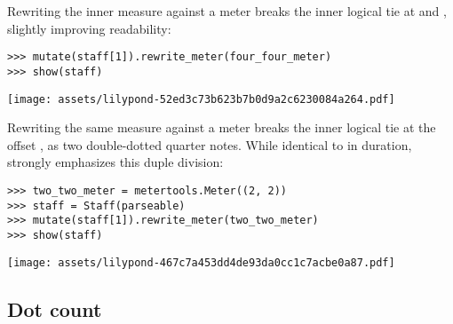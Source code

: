 \noindent Rewriting the inner measure against a  meter breaks the
inner logical tie at  and , slightly improving
readability:

\begin{comment}
<abjad>
mutate(staff[1]).rewrite_meter(four_four_meter)
show(staff)
</abjad>
\end{comment}

\begin{abjadbookoutput}
\begin{singlespacing}
\vspace{-0.5\baselineskip}
\begin{verbatim}
>>> mutate(staff[1]).rewrite_meter(four_four_meter)
>>> show(staff)
\end{verbatim}
\noindent\texttt{[image: assets/lilypond-52ed3c73b623b7b0d9a2c6230084a264.pdf]}
\end{singlespacing}
\end{abjadbookoutput}

\noindent Rewriting the same measure against a  meter breaks the
inner logical tie at the offset , as two double-dotted quarter
notes. While identical to  in duration,  strongly
emphasizes this duple division:

\begin{comment}
<abjad>
two_two_meter = metertools.Meter((2, 2))
staff = Staff(parseable)
mutate(staff[1]).rewrite_meter(two_two_meter)
show(staff)
</abjad>
\end{comment}

\begin{abjadbookoutput}
\begin{singlespacing}
\vspace{-0.5\baselineskip}
\begin{verbatim}
>>> two_two_meter = metertools.Meter((2, 2))
>>> staff = Staff(parseable)
>>> mutate(staff[1]).rewrite_meter(two_two_meter)
>>> show(staff)
\end{verbatim}
\noindent\texttt{[image: assets/lilypond-467c7a453dd4de93da0cc1c7acbe0a87.pdf]}
\end{singlespacing}
\end{abjadbookoutput}

\subsection{Dot count} %
\label{ssec:dot-count}

